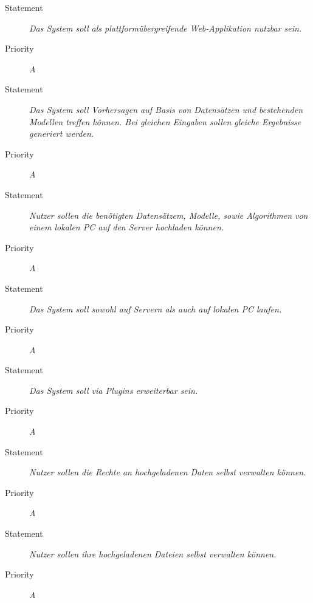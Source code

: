 \UR
\begin{description}
	\item [Statement] \textit{Das System soll als plattformübergreifende \gls{Web-Applikation} nutzbar sein.}
	\item [Priority] \textit{A}
\end{description}

\UR
\begin{description}
	\item[Statement] \textit{Das System soll Vorhersagen auf Basis von Datensätzen und bestehenden Modellen treffen können. Bei gleichen Eingaben sollen gleiche Ergebnisse generiert werden.}
	\item[Priority] \textit{A}
\end{description}


\UR
\begin{description}
	\item[Statement] \textit{Nutzer sollen die benötigten Datensätzem, Modelle, sowie Algorithmen von einem lokalen PC auf den Server hochladen können.}
	\item[Priority] \textit{A}
\end{description}

\UR
\begin{description}
	\item[Statement] \textit{Das System soll sowohl auf Servern als auch auf lokalen PC laufen.}
	\item[Priority] \textit{A}
\end{description}

\UR
\begin{description}
	\item[Statement] \textit{Das System soll via \gls{Plugins} erweiterbar sein.}
	\item[Priority] \textit{A}
\end{description}

\UR
\begin{description}
	\item[Statement] \textit{Nutzer sollen die Rechte an hochgeladenen Daten selbst verwalten können.}
	\item[Priority] \textit{A}
\end{description}

\UR
\begin{description}
	\item[Statement] \textit{Nutzer sollen ihre hochgeladenen Dateien selbst verwalten können.}
	\item[Priority] \textit{A}
\end{description}


